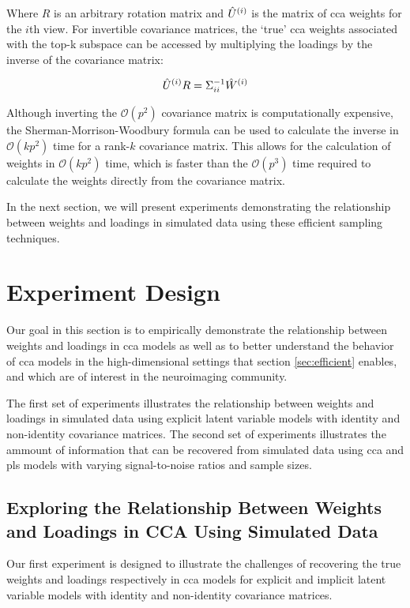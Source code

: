 Where $R$ is an arbitrary rotation matrix and $\hat{U}^{(i)}$ is the matrix of \acrshort{cca} weights for the $i$th view. For invertible covariance matrices, the `true' \acrshort{cca} weights associated with the top-k subspace can be accessed by multiplying the \gls{loadings} by the inverse of the covariance matrix:

\begin{align}
\hat{U}^{(i)}R = \Sigma_{ii}^{-1} \hat{W}^{(i)}
\end{align}

Although inverting the \(\mathcal{O}(p^2)\) covariance matrix is computationally expensive, the Sherman-Morrison-Woodbury formula can be used to calculate the inverse in \(\mathcal{O}(kp^2)\) time for a rank-$k$ covariance matrix. This allows for the calculation of weights in \(\mathcal{O}(kp^2)\) time, which is faster than the \(\mathcal{O}(p^3)\) time required to calculate the weights directly from the covariance matrix.

In the next section, we will present experiments demonstrating the relationship between weights and \gls{loadings} in simulated data using these efficient sampling techniques.

\section{Experiment Design}

Our goal in this section is to empirically demonstrate the relationship between weights and \gls{loadings} in \acrshort{cca} models as well as to better understand the behavior of \acrshort{cca} models in the high-dimensional settings that section \ref{sec:efficient} enables, and which are of interest in the neuroimaging community.

The first set of experiments illustrates the relationship between weights and \gls{loadings} in simulated data using explicit latent variable models with identity and non-identity covariance matrices.
The second set of experiments illustrates the ammount of information that can be recovered from simulated data using \acrshort{cca} and \acrshort{pls} models with varying signal-to-noise ratios and sample sizes.

\subsection{Exploring the Relationship Between Weights and Loadings in CCA Using Simulated Data}

Our first experiment is designed to illustrate the challenges of recovering the true weights and \gls{loadings} respectively in \acrshort{cca} models for explicit and implicit latent variable models with identity and non-identity covariance matrices.

